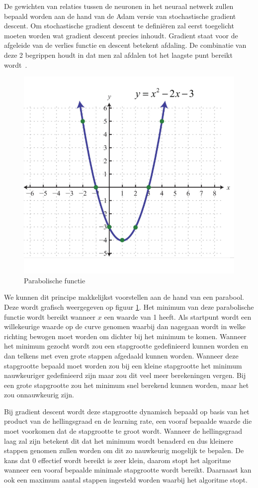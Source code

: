 De gewichten van relaties tussen de neuronen in het neuraal netwerk zullen bepaald worden aan de hand van de Adam versie van stochastische gradient descent. Om stochastische gradient descent te defini\"{e}ren zal eerst toegelicht moeten worden wat gradient descent precies inhoudt. Gradient staat voor de afgeleide van de verlies functie en descent betekent afdaling. De combinatie van deze 2 begrippen houdt in dat men zal afdalen tot het laagste punt bereikt wordt~\autocite{Srinivasan2019}.


\begin{figure}
    \centering
    \caption{Parabolische functie}
    \label{fig:parabolicfunction}
    \includegraphics[width=0.7\linewidth]{parabolicfunction}
\end{figure}

We kunnen dit principe makkelijkst voorstellen aan de hand van een parabool. Deze wordt grafisch weergegeven op figuur \ref{fig:parabolicfunction}. Het minimum van deze parabolische functie wordt bereikt wanneer $x$ een waarde van 1 heeft. 
Als startpunt wordt een willekeurige waarde op de curve genomen waarbij dan nagegaan wordt in welke richting bewogen moet worden om dichter bij het minimum te komen. Wanneer het minimum gezocht wordt zou een stapgrootte gedefinieerd kunnen worden en dan telkens met even grote stappen afgedaald kunnen worden. Wanneer deze stapgrootte bepaald moet worden zou bij een kleine stapgrootte het minimum nauwkeuriger gedefinieerd zijn maar zou dit veel meer berekeningen vergen. Bij een grote stapgrootte zou het minimum snel berekend kunnen worden, maar het zou onnauwkeurig zijn. 

Bij gradient descent wordt deze stapgrootte dynamisch bepaald op basis van het product van de hellingsgraad en de learning rate, een vooraf bepaalde waarde die moet voorkomen dat de stapgrootte te groot wordt. Wanneer de hellingsgraad laag zal zijn betekent dit dat het minimum wordt benaderd en dus kleinere stappen genomen zullen worden om dit zo nauwkeurig mogelijk te bepalen. De kans dat 0 effectief wordt bereikt is zeer klein, daarom stopt het algoritme wanneer een vooraf bepaalde minimale stapgrootte wordt bereikt. Daarnaast kan ook een maximum aantal stappen ingesteld worden waarbij het algoritme stopt. 

